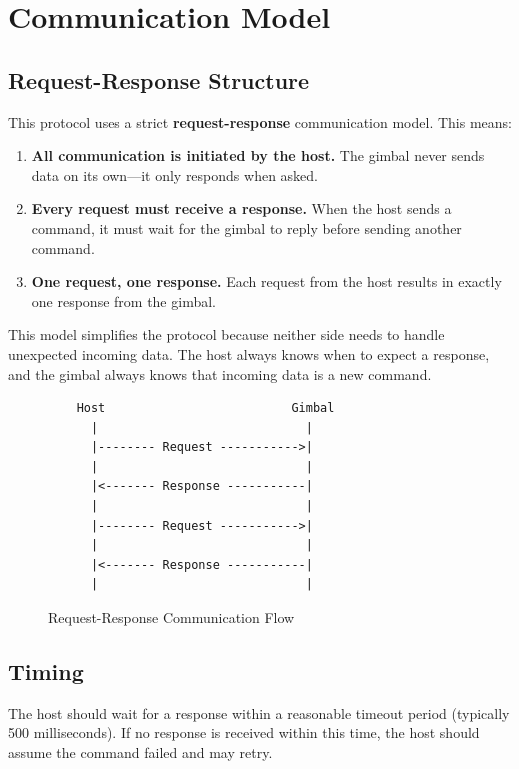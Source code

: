 \documentclass[12pt, titlepage]{article}
\begin{document}
\section{Communication Model}

\subsection{Request-Response Structure}

This protocol uses a strict \textbf{request-response} communication model. This
means:

\begin{enumerate}
  \item \textbf{All communication is initiated by the host.} The gimbal never sends data on its own---it only responds when asked.
  \item \textbf{Every request must receive a response.} When the host sends a command, it must wait for the gimbal to reply before sending another command.
  \item \textbf{One request, one response.} Each request from the host results in exactly one response from the gimbal.
\end{enumerate}

This model simplifies the protocol because neither side needs to handle
unexpected incoming data. The host always knows when to expect a response, and
the gimbal always knows that incoming data is a new command.

\begin{figure}[H]
  \centering
  \begin{verbatim}
    Host                          Gimbal
      |                             |
      |-------- Request ----------->|
      |                             |
      |<------- Response -----------|
      |                             |
      |-------- Request ----------->|
      |                             |
      |<------- Response -----------|
      |                             |
\end{verbatim}
  \caption{Request-Response Communication Flow}
\end{figure}

\subsection{Timing}

The host should wait for a response within a reasonable timeout period
(typically 500 milliseconds). If no response is received within this time, the
host should assume the command failed and may retry.
\end{document}
